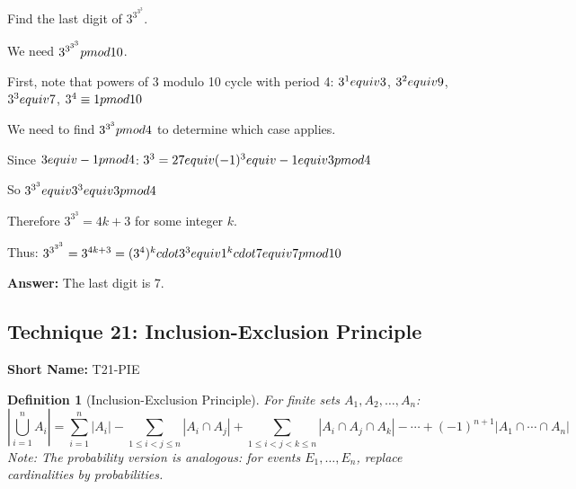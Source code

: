 \documentclass[12pt]{article}
\newtheorem{definition}{Definition}[section]
\newenvironment{problem}[1]
{\begin{tcolorbox}[colback=blue!5!white,colframe=blue!75!black,title={#1}]}{\end{tcolorbox}}
\newenvironment{solution}
{\begin{tcolorbox}[colback=green!5!white,colframe=green!75!black,title={Solution}]}{\end{tcolorbox}}
\begin{document}
\begin{problem}{AMC 12 Example}
Find the last digit of $3^{3^{3^3}}$.
\end{problem}

\begin{solution}
We need $3^{3^{3^3}} \\pmod{10}$.

First, note that powers of 3 modulo 10 cycle with period 4:
$3^1 \\equiv 3$, $3^2 \\equiv 9$, $3^3 \\equiv 7$, $3^4 \\\equiv 1 \\pmod{10}$

We need to find $3^{3^3} \\pmod{4}$ to determine which case applies.

Since $3 \\equiv -1 \\pmod{4}$:
$3^3 = 27 \\equiv (-1)^3 \\equiv -1 \\equiv 3 \\pmod{4}$

So $3^{3^3} \\equiv 3^3 \\equiv 3 \\pmod{4}$

Therefore $3^{3^3} = 4k + 3$ for some integer $k$.

Thus: $3^{3^{3^3}} = 3^{4k+3} = (3^4)^k \\cdot 3^3 \\equiv 1^k \\cdot 7 \\equiv 7 \\pmod{10}$

\textbf{Answer:} The last digit is 7.
\end{solution}

\subsection{Technique 21: Inclusion-Exclusion Principle}
\textbf{Short Name:} T21-PIE

\begin{definition}[Inclusion-Exclusion Principle]
For finite sets $A_1, A_2, \ldots, A_n$:
$$\left|\bigcup_{i=1}^n A_i\right| = \sum_{i=1}^n |A_i| - \sum_{1 \le i < j \le n} |A_i \cap A_j| + \sum_{1 \le i < j < k \le n} |A_i \cap A_j \cap A_k| - \cdots + (-1)^{n+1}|A_1 \cap \cdots \cap A_n|$$
\medskip
Note: The probability version is analogous: for events $E_1,\dots,E_n$, replace cardinalities by probabilities.
\end{definition}
\end{document}
